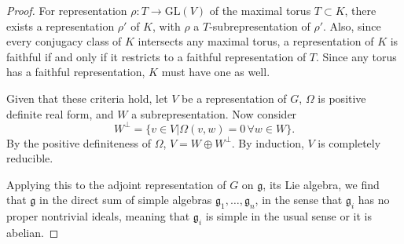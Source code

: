 \documentclass[12pt]{article}
\newcommand{\fr}[1]{\mathfrak{#1}}
\begin{document}
\begin{proof}
For representation $\rho:T\to \mathrm{GL}(V)$ of the maximal torus $T\subset K$, there exists a representation $\rho'$ of $K$, with $\rho$ a $T$-subrepresentation of $\rho'$.  Also, since every conjugacy class of $K$ intersects any maximal torus, a representation of $K$ is faithful if and only if it restricts to a faithful representation of $T$.  Since any torus has a faithful representation, $K$ must have one as well.

Given that these criteria hold, let $V$ be a representation of $G$, $\Omega$ is positive definite real form, and $W$ a subrepresentation.  Now consider $$W^{\perp}=\{v\in V|\Omega(v,w)=0 \,\forall w\in W\}.$$  By the positive definiteness of $\Omega$, $V=W\oplus W^{\perp}$.  By induction, $V$ is completely reducible.

Applying this to the adjoint representation of $G$ on $\fr g$, its Lie algebra,
we find that $\fr g$ in the direct sum of simple algebras $\fr g_1,\ldots,\fr g_n$, in the sense that $\fr g_i$ has no proper nontrivial ideals, meaning that $\fr g_i$ is simple in the usual sense or it is abelian.  
\end{proof}
\end{document}
